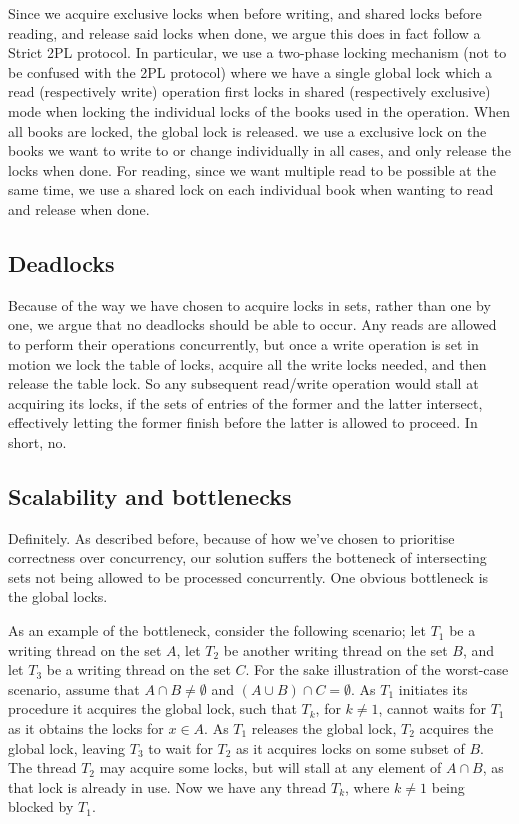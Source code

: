 Since we acquire exclusive locks when before writing, and shared locks before reading, and release said locks when done, we argue this does in fact follow a Strict 2PL protocol. In particular, we use a two-phase locking mechanism (not to be confused with the 2PL protocol) where we have a single global lock which a read (respectively write) operation first locks in shared (respectively exclusive) mode when locking the individual locks of the books used in the operation. When all books are locked, the global lock is released. we use a exclusive lock on the books we want to write to or change individually in all cases, and only release the locks when done. For reading, since we want multiple read to be possible at the same time, we use a shared lock on each individual book when wanting to read and release when done.

\subsection{Deadlocks}
Because of the way we have chosen to acquire locks in sets, rather than one by
one, we argue that no deadlocks should be able to occur. Any reads are allowed
to perform their operations concurrently, but once a write operation is set in
motion we lock the table of locks, acquire all the write locks needed, and then
release the table lock. So any subsequent read/write operation would stall at
acquiring its locks, if the sets of entries of the former and the latter
intersect, effectively letting the former finish before the latter is allowed
to proceed. In short, no.

\subsection{Scalability and bottlenecks}
Definitely. As described before, because of how we've chosen to prioritise
correctness over concurrency, our solution suffers the botteneck of intersecting
sets not being allowed to be processed concurrently.
One obvious bottleneck is the global locks.

As an example of the bottleneck, consider the following scenario; let $T_1$ be
a writing thread on the set $A$, let $T_2$ be another writing thread on the set
$B$, and let $T_3$ be a writing thread on the set $C$. For the sake illustration
of the worst-case scenario, assume that $A \cap B \neq \emptyset$ and $(A \cup B)
\cap C = \emptyset$. As $T_1$ initiates its procedure it acquires the global lock,
such that $T_k$, for $k \neq 1$, cannot waits for $T_1$ as it obtains the locks
for $x \in A$. As $T_1$ releases the global lock, $T_2$ acquires the global lock,
leaving $T_3$ to wait for $T_2$ as it acquires locks on some subset of $B$. The
thread $T_2$ may acquire some locks, but will stall at any element of $A \cap B$,
as that lock is already in use. Now we have any thread $T_k$, where $k \neq 1$
being blocked by $T_1$.

